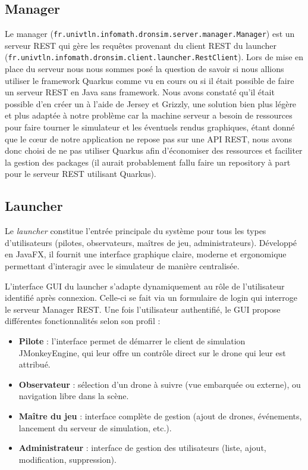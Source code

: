\documentclass{scrartcl}
\begin{document}
\subsection{Manager}
Le manager (\texttt{fr.univtln.infomath.dronsim.server.manager.Manager}) est un serveur REST qui gère
les requêtes provenant du client REST du launcher \\(\texttt{fr.univtln.infomath.dronsim.client.launcher.RestClient}).
Lors de mise en place du serveur nous nous sommes posé la question de savoir si nous allions utiliser le framework Quarkus
comme vu en cours ou si il était possible de faire un serveur REST en Java sans framework. Nous avons constaté qu’il était possible d’en créer un à l’aide de Jersey et Grizzly, une solution bien plus légère et plus adaptée à notre problème
car la machine serveur a besoin de ressources pour faire tourner le simulateur et les éventuels rendus graphiques, étant donné que
le cœur de notre application ne repose pas sur une API REST, nous avons donc choisi de ne pas utiliser Quarkus afin d'économiser des ressources
et faciliter la gestion des packages (il aurait probablement fallu faire un repository à part pour le serveur REST utilisant Quarkus).


\subsection{Launcher}
Le \textit{launcher} constitue l'entrée principale du système pour tous les types d'utilisateurs (pilotes, observateurs, maîtres de jeu, administrateurs). Développé en JavaFX, il fournit une interface graphique claire, moderne et ergonomique permettant d'interagir avec le simulateur de manière centralisée.

L'interface GUI du launcher s'adapte dynamiquement au rôle de l'utilisateur identifié après connexion. Celle-ci se fait via un formulaire de login qui interroge le serveur Manager REST. Une fois l'utilisateur authentifié, le GUI propose différentes fonctionnalités selon son profil :
\begin{itemize}
    \item \textbf{Pilote} : l'interface permet de démarrer le client de simulation JMonkeyEngine, qui leur offre un contrôle direct sur le drone qui leur est attribué.
    \item \textbf{Observateur} : sélection d'un drone à suivre (vue embarquée ou externe), ou navigation libre dans la scène.
    \item \textbf{Maître du jeu} : interface complète de gestion (ajout de drones, événements, lancement du serveur de simulation, etc.).
    \item \textbf{Administrateur} : interface de gestion des utilisateurs (liste, ajout, modification, suppression).
\end{itemize}
\end{document}
